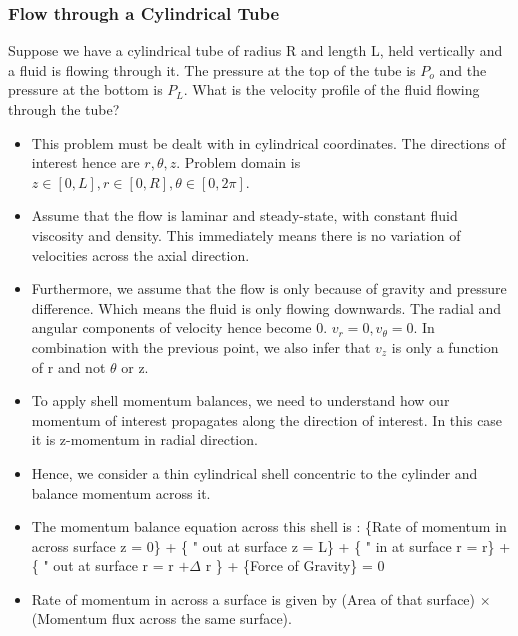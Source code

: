 

\subsubsection{Flow through a Cylindrical Tube}

Suppose we have a cylindrical tube of radius R and length L, held vertically and a fluid is flowing through it. The pressure at the top of the tube is $P_o$ and the pressure at the bottom is $P_L$. What is the velocity profile of the fluid flowing through the tube?


\begin{itemize}
    \item This problem must be dealt with in cylindrical coordinates. The directions of interest hence are $r, \theta, z$. Problem domain is $z \in [0, L] , r \in [0, R], \theta \in [0, 2\pi]$.

    \item Assume that the flow is laminar and steady-state, with constant fluid viscosity and density. This immediately means there is no variation of velocities across the axial direction.

    \item Furthermore, we assume that the flow is only because of gravity and pressure difference. Which means the fluid is only flowing downwards. The radial and angular components of velocity hence become 0. $v_r = 0, v_{\theta} = 0$. In combination with the previous point, we also infer that $v_z$ is only a function of r and not $\theta$ or z.

    \item To apply shell momentum balances, we need to understand how our momentum of interest propagates along the direction of interest. In this case it is z-momentum in radial direction.

    \item Hence, we consider a thin cylindrical shell concentric to the cylinder and balance momentum across it.

    \item The momentum balance equation across this shell is : \{Rate of momentum in across surface z = 0\} + \{ " out at surface z = L\} + \{ " in at surface r = r\} + \{ " out at surface r = r $+ \Delta$ r \} + \{Force of Gravity\} = 0

    \item Rate of momentum in across a surface is given by (Area of that surface) $\times$ (Momentum flux across the same surface).


\end{itemize}
